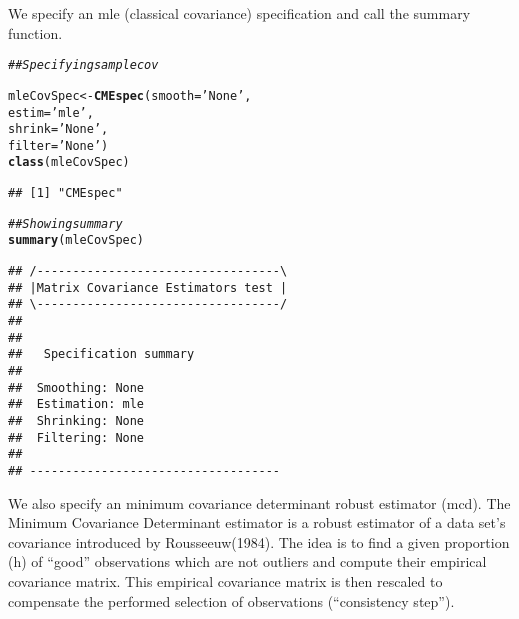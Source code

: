 \documentclass[12pt,letterpaper,english]{article}\usepackage[]{graphicx}\usepackage[]{color}
\makeatletter
\newcommand{\hlstr}[1]{\textcolor[rgb]{0.192,0.494,0.8}{#1}}%
\newcommand{\hlcom}[1]{\textcolor[rgb]{0.678,0.584,0.686}{\textit{#1}}}%
\newcommand{\hlstd}[1]{\textcolor[rgb]{0.345,0.345,0.345}{#1}}%
\newcommand{\hlkwb}[1]{\textcolor[rgb]{0.69,0.353,0.396}{#1}}%
\newcommand{\hlkwc}[1]{\textcolor[rgb]{0.333,0.667,0.333}{#1}}%
\newcommand{\hlkwd}[1]{\textcolor[rgb]{0.737,0.353,0.396}{\textbf{#1}}}%
\newenvironment{kframe}{%
 \def\at@end@of@kframe{}%
 \ifinner\ifhmode%
  \def\at@end@of@kframe{\end{minipage}}%
  \begin{minipage}{\columnwidth}%
 \fi\fi%
 \def\FrameCommand##1{\hskip\@totalleftmargin \hskip-\fboxsep
 \colorbox{shadecolor}{##1}\hskip-\fboxsep
     \hskip-\linewidth \hskip-\@totalleftmargin \hskip\columnwidth}%
 \MakeFramed {\advance\hsize-\width
   \@totalleftmargin\z@ \linewidth\hsize
   \@setminipage}}%
 {\par\unskip\endMakeFramed%
 \at@end@of@kframe}
\newenvironment{knitrout}{}{} %
\makeatother
\begin{document}
We specify an mle (classical covariance) specification and call the summary function.
\begin{knitrout}
\color{fgcolor}\begin{kframe}
\begin{alltt}
\hlcom{## Specifying sample cov}

\hlstd{mleCovSpec} \hlkwb{<-} \hlkwd{CMEspec}\hlstd{(}\hlkwc{smooth} \hlstd{=} \hlstr{'None'}\hlstd{,}
                      \hlkwc{estim} \hlstd{=} \hlstr{'mle'}\hlstd{,}
                      \hlkwc{shrink} \hlstd{=} \hlstr{'None'}\hlstd{,}
                      \hlkwc{filter} \hlstd{=} \hlstr{'None'}\hlstd{)}
\hlkwd{class}\hlstd{(mleCovSpec)}
\end{alltt}
\begin{verbatim}
## [1] "CMEspec"
\end{verbatim}
\begin{alltt}
\hlcom{## Showing summary}
\hlkwd{summary}\hlstd{(mleCovSpec)}
\end{alltt}
\begin{verbatim}
## /----------------------------------\
## |Matrix Covariance Estimators test |
## \----------------------------------/
## 
## 
## 	 Specification summary
## 
## 	Smoothing: None
## 	Estimation: mle
## 	Shrinking: None
## 	Filtering: None
## 
## -----------------------------------
\end{verbatim}
\end{kframe}
\end{knitrout}


We also specify an minimum covariance determinant robust estimator (mcd).
The Minimum Covariance Determinant estimator is a robust estimator of a data set’s covariance introduced by Rousseeuw(1984). The idea is to find a given proportion (h) of “good” observations which are not outliers and compute their empirical covariance matrix. This empirical covariance matrix is then rescaled to compensate the performed selection of observations (“consistency step”).
\end{document}
